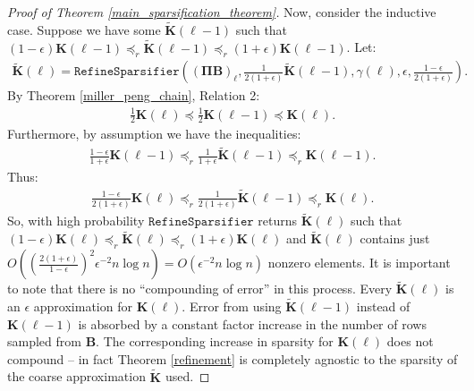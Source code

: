 \documentclass[11pt]{article}
\newcommand{\bv}[1]{\mathbf{#1}}
\begin{document}
\begin{proof}[Proof of Theorem \ref{main_sparsification_theorem}]
Now, consider the inductive case. Suppose we have some $\bv{\tilde K}(\ell - 1)$ such that $(1-\epsilon)\bv{K}(\ell - 1) \preceq_{r} \bv{\tilde K}(\ell - 1) \preceq_r (1+\epsilon)\bv{K}(\ell - 1)$. Let:
\begin{align*}
\bv{\tilde K}(\ell) = \texttt{RefineSparsifier}((\bv{\Pi}\bv{B})_{\ell}, \frac{1}{2(1+\epsilon)}\bv{\tilde K}(\ell - 1), \gamma(\ell), \epsilon, \frac{1-\epsilon}{2(1+\epsilon)}).
\end{align*}
By Theorem \ref{miller_peng_chain}, Relation 2:
\begin{align*}
\frac{1}{2}\bv{K}(\ell) \preceq \frac{1}{2}\bv{K}(\ell-1) \preceq \bv{K}(\ell).
\end{align*}
Furthermore, by assumption we have the inequalities:
\begin{align*}
\frac{1-\epsilon}{1+\epsilon}\bv{K}(\ell - 1) \preceq_{r} \frac{1}{1+\epsilon}\bv{\tilde K}(\ell - 1) \preceq_r \bv{K}(\ell - 1).
\end{align*}
Thus:
\begin{align*}
\frac{1-\epsilon}{2(1+\epsilon)}\bv{K}(\ell) \preceq_{r} \frac{1}{2(1+\epsilon)}\bv{\tilde K}(\ell - 1) \preceq_r \bv{K}(\ell).
\end{align*}
So, with high probability $\texttt{RefineSparsifier}$ returns $\bv{\tilde K}(\ell)$ such that $(1-\epsilon)\bv{K}(\ell) \preceq_{r} \bv{\tilde K}(\ell) \preceq_r (1+\epsilon)\bv{K}(\ell)$ and $\bv{\tilde K}(\ell)$ contains just $O((\frac{2(1+\epsilon)}{1-\epsilon})^2 \epsilon^{-2} n\log n ) = O(\epsilon^{-2} n\log n)$ nonzero elements. It is important to note that there is no ``compounding of error'' in this process. Every $\bv{\tilde K}(\ell)$ is an $\epsilon$ approximation for $\bv{K}(\ell)$. Error from using $\bv{\tilde K}(\ell-1)$ instead of $\bv{K}(\ell-1)$ is absorbed by a constant factor increase in the number of rows sampled from $\bv{B}$. The corresponding increase in sparsity for $\bv{K}(\ell)$ does not compound -- in fact Theorem \ref{refinement} is completely agnostic to the sparsity of the coarse approximation $\bv{\tilde K}$ used.


\end{proof}
\end{document}
